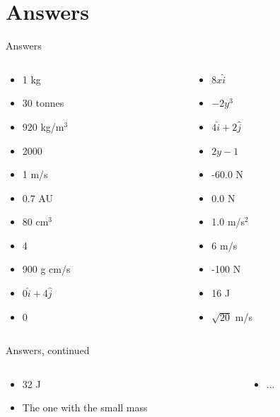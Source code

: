 \documentclass{beamer}
\begin{document}
\section{Answers}

\begin{frame}{Answers}
\begin{columns}[T]
\begin{column}{0.5\textwidth}
\begin{itemize}
\item 1 kg
\item 30 tonnes
\item 920 kg/m$^3$
\item 2000
\item 1 m/s
\item 0.7 AU
\item 80 cm$^3$
\item 4
\item 900 g cm/s
\item $0\hat{i}+4\hat{j}$
\item 0
\end{itemize}
\end{column}
\begin{column}{0.5\textwidth}
\begin{itemize}
\item $8x\hat{i}$
\item $-2y^3$
\item $4\hat{i}+2\hat{j}$
\item $2y-1$
\item -60.0 N
\item 0.0 N
\item 1.0 m/s$^2$
\item 6 m/s
\item -100 N
\item 16 J
\item $\sqrt{20}$ m/s
\end{itemize}
\end{column}
\end{columns}
\end{frame}

\begin{frame}{Answers, continued}
\begin{columns}[T]
\begin{column}{0.5\textwidth}
\begin{itemize}
\item 32 J
\item The one with the small mass
\end{itemize}
\end{column}
\begin{column}{0.5\textwidth}
\begin{itemize}
\item ...
\end{itemize}
\end{column}
\end{columns}
\end{frame}
\end{document}
